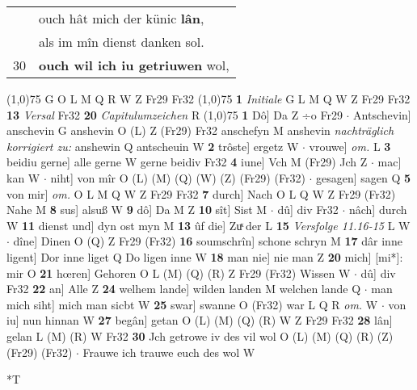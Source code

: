 \documentclass[8pt,a4paper,notitlepage]{article}
\begin{document}
\begin{table}[ht]
\begin{minipage}[t]{0.5\linewidth}
\begin{tabular}{rl}
 & ouch hât mich der künic \textbf{lân},\\ 
 & als im mîn dienst danken sol.\\ 
30 & \textbf{ouch wil ich iu getriuwen} wol,\\ 
\end{tabular}
\scriptsize
\line(1,0){75} \newline
G O L M Q R W Z Fr29 Fr32 \newline
\line(1,0){75} \newline
\textbf{1} \textit{Initiale} G L M Q W Z Fr29 Fr32  \textbf{13} \textit{Versal} Fr32  \textbf{20} \textit{Capitulumzeichen} R  \newline
\line(1,0){75} \newline
\textbf{1} Dô] Da Z ÷o Fr29  $\cdot$ Antschevin] anschevin G anshevin O (L) Z (Fr29) Fr32 anschefyn M anshevin \textit{nachträglich korrigiert zu:} anshewin Q antscheuin W \textbf{2} trôste] ergetz W  $\cdot$ vrouwe] \textit{om.} L \textbf{3} beidiu gerne] alle gerne W gerne beidiv Fr32 \textbf{4} iune] Vch M (Fr29) Jch Z  $\cdot$ mac] kan W  $\cdot$ niht] von mîr O (L) (M) (Q) (W) (Z) (Fr29) (Fr32)  $\cdot$ gesagen] sagen Q \textbf{5} von mir] \textit{om.} O L M Q W Z Fr29 Fr32 \textbf{7} durch] Nach O L Q W Z Fr29 (Fr32) Nahe M \textbf{8} sus] alsuß W \textbf{9} dô] Da M Z \textbf{10} sît] Sist M  $\cdot$ dû] div Fr32  $\cdot$ nâch] durch W \textbf{11} dienst und] dyn ost myn M \textbf{13} ûf die] Zuͯ der L \textbf{15} \textit{Versfolge 11.16-15} L W   $\cdot$ dîne] Dinen O (Q) Z Fr29 (Fr32) \textbf{16} soumschrîn] schone schryn M \textbf{17} dâr inne ligent] Dor inne liget Q Do ligen inne W \textbf{18} man nie] nie man Z \textbf{20} mich] [mi*]: mir O \textbf{21} hœren] Gehoren O L (M) (Q) (R) Z Fr29 (Fr32) Wissen W  $\cdot$ dû] div Fr32 \textbf{22} an] Alle Z \textbf{24} welhem lande] wilden landen M welchen lande Q  $\cdot$ man mich siht] mich man sicbt W \textbf{25} swar] swanne O (Fr32) war L Q R \textit{om.} W  $\cdot$ von iu] nun hinnan W \textbf{27} begân] getan O (L) (M) (Q) (R) W Z Fr29 Fr32 \textbf{28} lân] gelan L (M) (R) W Fr32 \textbf{30} Jch getrowe iv des vil wol O (L) (M) (Q) (R) (Z) (Fr29) (Fr32)  $\cdot$ Frauwe ich trauwe euch des wol W \newline
\end{minipage}
\hspace{0.5cm}
\begin{minipage}[t]{0.5\linewidth}
\small
\begin{center}*T
\end{center}
\begin{tabular}{rl}

\end{tabular}
\end{minipage}
\end{table}
\end{document}
